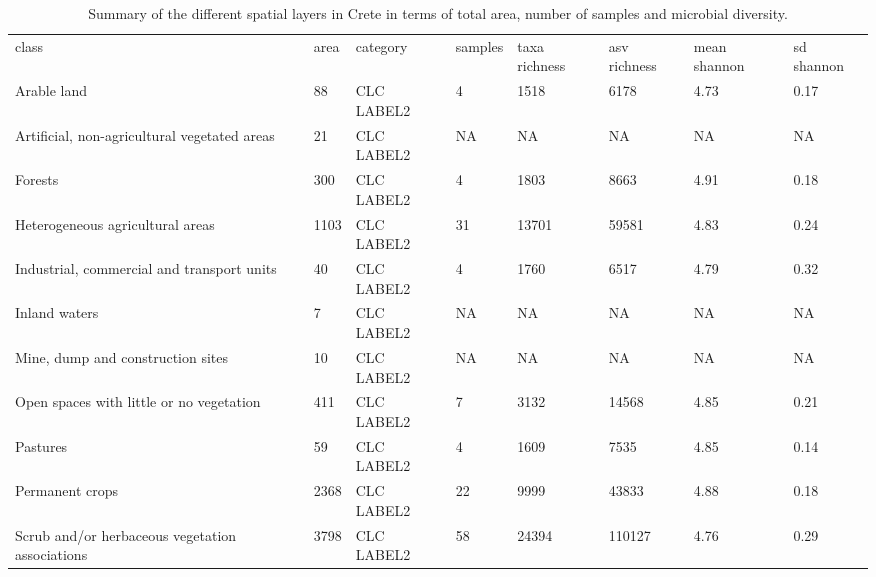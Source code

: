 \documentclass[unnumsec,webpdf,contemporary,large]{oup-authoring-template}%
\theoremstyle{thmstyleone}%
\theoremstyle{thmstyletwo}%
\theoremstyle{thmstylethree}%
\begin{document}
\begin{sidewaystable*}
    \caption{Summary of the different spatial layers in Crete in terms of total area, number of samples and microbial diversity.\label{table:data_cube_summary}}
\begin{tabular*}{\textwidth}{@{\extracolsep{\fill}}llllllll@{\extracolsep{\fill}}}
\tabcolsep=0pt%
class                                           & area & category             & samples & taxa richness & asv richness & mean shannon & sd shannon \\
Arable land                                     & 88   & CLC LABEL2           & 4       & 1518           & 6178          & 4.73          & 0.17        \\
Artificial, non-agricultural vegetated areas    & 21   & CLC LABEL2           & NA      & NA             & NA            & NA            & NA          \\
Forests                                         & 300  & CLC LABEL2           & 4       & 1803           & 8663          & 4.91          & 0.18        \\
Heterogeneous agricultural areas                & 1103 & CLC LABEL2           & 31      & 13701          & 59581         & 4.83          & 0.24        \\
Industrial, commercial and transport units      & 40   & CLC LABEL2           & 4       & 1760           & 6517          & 4.79          & 0.32        \\
Inland waters                                   & 7    & CLC LABEL2           & NA      & NA             & NA            & NA            & NA          \\
Mine, dump and construction sites               & 10   & CLC LABEL2           & NA      & NA             & NA            & NA            & NA          \\
Open spaces with little or no vegetation        & 411  & CLC LABEL2           & 7       & 3132           & 14568         & 4.85          & 0.21        \\
Pastures                                        & 59   & CLC LABEL2           & 4       & 1609           & 7535          & 4.85          & 0.14        \\
Permanent crops                                 & 2368 & CLC LABEL2           & 22      & 9999           & 43833         & 4.88          & 0.18        \\
Scrub and/or herbaceous vegetation associations & 3798 & CLC LABEL2           & 58      & 24394          & 110127        & 4.76          & 0.29        \\

\end{tabular*}
\end{sidewaystable*}
\end{document}
